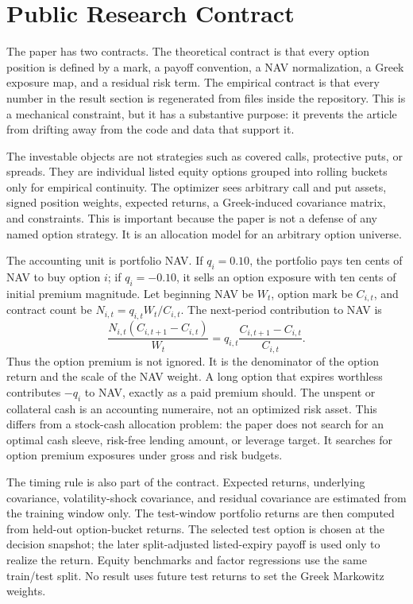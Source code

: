 \section{Public Research Contract}

The paper has two contracts. The theoretical contract is that every option position is
defined by a mark, a payoff convention, a NAV normalization, a Greek exposure map, and a
residual risk term. The empirical contract is that every number in the result section is
regenerated from files inside the repository. This is a mechanical constraint, but it has
a substantive purpose: it prevents the article from drifting away from the code and data
that support it.

The investable objects are not strategies such as covered calls, protective puts, or
spreads. They are individual listed equity options grouped into rolling buckets only for
empirical continuity. The optimizer sees arbitrary call and put assets, signed position
weights, expected returns, a Greek-induced covariance matrix, and constraints. This is
important because the paper is not a defense of any named option strategy. It is an
allocation model for an arbitrary option universe.

The accounting unit is portfolio NAV. If \(q_i=0.10\), the portfolio pays ten cents of
NAV to buy option \(i\); if \(q_i=-0.10\), it sells an option exposure with ten cents of
initial premium magnitude. Let beginning NAV be \(W_t\), option mark be \(C_{i,t}\), and
contract count be \(N_{i,t}=q_{i,t}W_t/C_{i,t}\). The next-period contribution to NAV is
\[
  \frac{N_{i,t}(C_{i,t+1}-C_{i,t})}{W_t}
  =
  q_{i,t}\frac{C_{i,t+1}-C_{i,t}}{C_{i,t}} .
\]
Thus the option premium is not ignored. It is the denominator of the option return and
the scale of the NAV weight. A long option that expires worthless contributes \(-q_i\) to
NAV, exactly as a paid premium should. The unspent or collateral cash is an accounting
numeraire, not an optimized risk asset. This differs from a stock-cash allocation problem:
the paper does not search for an optimal cash sleeve, risk-free lending amount, or
leverage target. It searches for option premium exposures under gross and risk budgets.

The timing rule is also part of the contract. Expected returns, underlying covariance,
volatility-shock covariance, and residual covariance are estimated from the training window
only. The test-window portfolio returns are then computed from held-out option-bucket
returns. The selected test option is chosen at the decision snapshot; the later
split-adjusted listed-expiry payoff is used only to realize the return. Equity benchmarks
and factor regressions use the same train/test split. No result uses future test returns
to set the Greek Markowitz weights.

